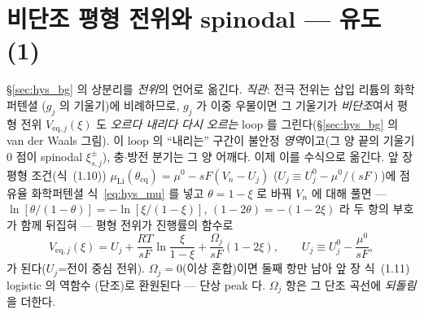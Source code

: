 \documentclass[11pt,a4paper]{article}
\newcommand{\eq}{\mathrm{eq}}
\begin{document}
\section{비단조 평형 전위와 spinodal — 유도 (1)}\label{sec:hys_spinodal}
\S\ref{sec:hys_bg} 의 상분리를 \emph{전위}의 언어로 옮긴다. \emph{직관}: 전극 전위는 삽입 리튬의 화학퍼텐셜
($g_j$ 의 기울기)에 비례하므로, $g_j$ 가 이중 우물이면 그 기울기가 \emph{비단조}여서 평형 전위 $V_{\eq,j}(\xi)$ 도
\emph{오르다 내리다 다시 오르는} loop 를 그린다(\S\ref{sec:hys_bg} 의 van der Waals 그림). 이 loop 의 ``내리는''
구간이 불안정 \emph{영역}이고(그 양 끝의 기울기 $0$ 점이 spinodal $\xi_{s,j}^\pm$), 충$\cdot$방전 분기는 그 양
어깨다. 이제 이를 수식으로 옮긴다.
앞 장 평형 조건(식~(1.10)) $\mu_\mathrm{Li}(\theta_\eq)
=\mu^0-sF(V_n-U_j)$ ($U_j\equiv U_j^0-\mu^0/(sF)$)에 점유율 화학퍼텐셜 식~\eqref{eq:hys_mu} 를 넣고 $\theta=1-\xi$
로 바꿔 $V_n$ 에 대해 풀면 — $\ln[\theta/(1-\theta)]=-\ln[\xi/(1-\xi)]$, $(1-2\theta)=-(1-2\xi)$ 라 두 항의 부호가
함께 뒤집혀 — 평형 전위가 진행률의 함수로
\begin{equation}
V_{\eq,j}(\xi)=U_j+\frac{RT}{sF}\ln\frac{\xi}{1-\xi}+\frac{\Omega_j}{sF}(1-2\xi),
\qquad U_j\equiv U_j^0-\frac{\mu^0}{sF},
\label{eq:hys_Veq}
\end{equation}
가 된다($U_j$=전이 중심 전위). $\Omega_j=0$(이상 혼합)이면 둘째 항만 남아 앞 장 식~(1.11) logistic 의 역함수
(단조)로 환원된다 — 단상 peak 다. $\Omega_j$ 항은 그 단조 곡선에 \emph{되돌림}을 더한다.
\end{document}
